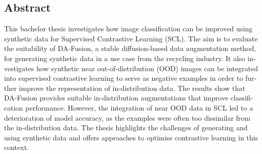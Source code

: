 {
  \begin{otherlanguage}{english}
    \section*{Abstract}

      This bachelor thesis investigates how image classification can be improved using synthetic data for Supervised Contrastive Learning (SCL). The aim is to evaluate the suitability of DA-Fusion, a stable diffusion-based data augmentation method, for generating synthetic data in a use case from the recycling industry. It also investigates how synthetic near out-of-distribution (OOD) images can be integrated into supervised contrastive learning to serve as negative examples in order to further improve the representation of in-distribution data. The results show that DA-Fusion provides suitable in-distribution augmentations that improve classification performance. However, the integration of near OOD data in SCL led to a deterioration of model accuracy, as the examples were often too dissimilar from the in-distribution data. The thesis highlights the challenges of generating and using synthetic data and offers approaches to optimise contrastive learning in this context.
  \end{otherlanguage}
}
